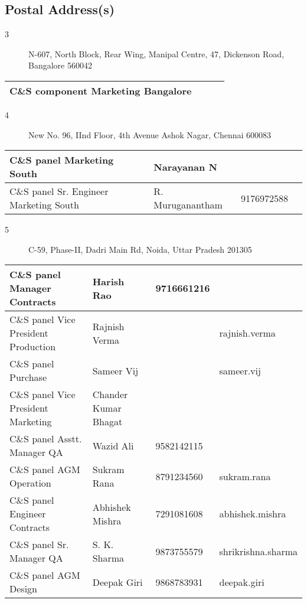 \documentclass[a4paper, 11pt, twoside]{book}
\begin{document}
\subsection*{Postal Address(s)}
\begin{description}
\item [3]N-607, North Block, Rear Wing, Manipal Centre, 47, Dickenson Road, Bangalore  560042
\end{description}
\begin{tabular}{|p{4cm}|p{2cm}|p{2cm}|p{3cm}|}
\hline
C\&S component Marketing Bangalore & & &  \\ \hline
\end{tabular}
\begin{description}
\item [4]New No. 96, IInd Floor, 4th Avenue Ashok Nagar, Chennai 600083
\end{description}
\begin{tabular}{|p{4cm}|p{2cm}|p{2cm}|p{3cm}|}
\hline
C\&S panel Marketing South & Narayanan N &  &  \\ \hline
C\&S panel Sr. Engineer Marketing South & R. Muruganantham & 9176972588 &  \\ \hline
\end{tabular}
\begin{description}
\item [5]C-59, Phase-II, Dadri Main Rd, Noida, Uttar Pradesh 201305
\end{description}
\begin{tabular}{|p{4cm}|p{2cm}|p{2cm}|p{3cm}|}
\hline
C\&S panel Manager Contracts & Harish Rao & 9716661216 &  \\ \hline
C\&S panel Vice President Production & Rajnish Verma &  & rajnish.verma \\ \hline
C\&S panel Purchase & Sameer Vij &  & sameer.vij \\ \hline
C\&S panel Vice President Marketing & Chander Kumar Bhagat &  &  \\ \hline
C\&S panel Asstt. Manager QA & Wazid Ali & 9582142115 &  \\ \hline
C\&S panel AGM Operation & Sukram Rana & 8791234560 & sukram.rana \\ \hline
C\&S panel Engineer Contracts & Abhishek Mishra & 7291081608 & abhishek.mishra \\ \hline
C\&S panel Sr. Manager QA & S. K. Sharma & 9873755579 & shrikrishna.sharma \\ \hline
C\&S panel AGM Design & Deepak Giri & 9868783931 & deepak.giri \\ \hline
\end{tabular}
\end{document}
